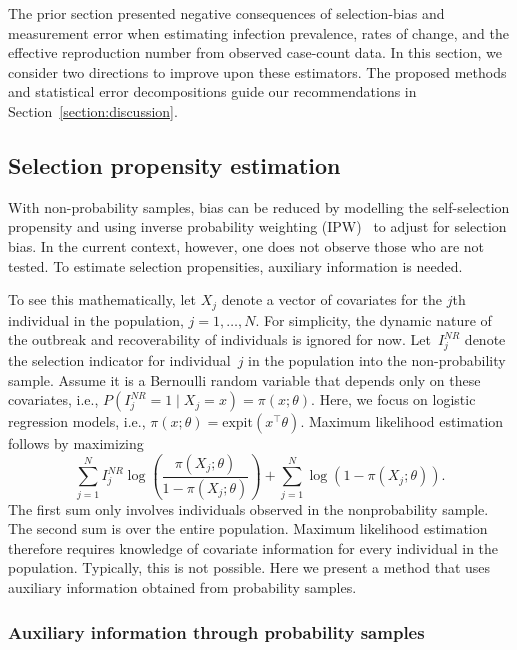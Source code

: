 \documentclass[11pt]{amsart}
\numberwithin{equation}{section}
\theoremstyle{plain}
\begin{document}
 The prior section presented negative consequences of selection-bias and measurement error when estimating infection prevalence, rates of change, and the effective reproduction number from observed case-count data.  In this section, we consider two directions to improve upon these estimators.
 The proposed methods and statistical error decompositions guide our recommendations in Section~\ref{section:discussion}.

 \subsection{Selection propensity estimation}

 With non-probability samples, bias can be reduced by modelling the self-selection propensity and using inverse probability weighting (IPW)~\citep{Elliott2017} to adjust for selection bias.
 In the current context, however, one does not observe those who are not tested.  To estimate selection propensities, auxiliary information is needed.

 To see this mathematically, let $X_j$ denote a vector of covariates for the $j$th individual in the population, $j=1,\ldots,N$.  For simplicity, the dynamic nature of the outbreak and recoverability of individuals is ignored for now. Let~$I_j^{NR}$ denote the selection indicator for individual~$j$ in the population into the non-probability sample.  Assume it is a Bernoulli random variable that depends only on these covariates, i.e., $P(I^{NR}_j = 1 \mid X_j = x) = \pi (x; \theta)$. Here, we focus on logistic regression models, i.e., $\pi(x; \theta) = \text{expit} \left( x^\top \theta \right)$. Maximum likelihood estimation follows by maximizing
 \begin{equation}
 \label{eq:propensity}
 \sum_{j=1}^N I_j^{NR} \log \left( \frac{\pi (X_j; \theta)}{1-\pi(X_j; \theta)} \right) + \sum_{j=1}^N \log \left( 1 - \pi (X_j; \theta) \right).
 \end{equation}
 The first sum only involves individuals observed in the nonprobability sample.
 The second sum is over the entire population.  Maximum likelihood estimation therefore requires knowledge of covariate information for every individual in the population.  Typically, this is not possible.  Here we present a method that uses auxiliary information obtained from probability samples.

 \subsubsection{Auxiliary information through probability samples}
 \label{subsec:auxprob}
\end{document}
